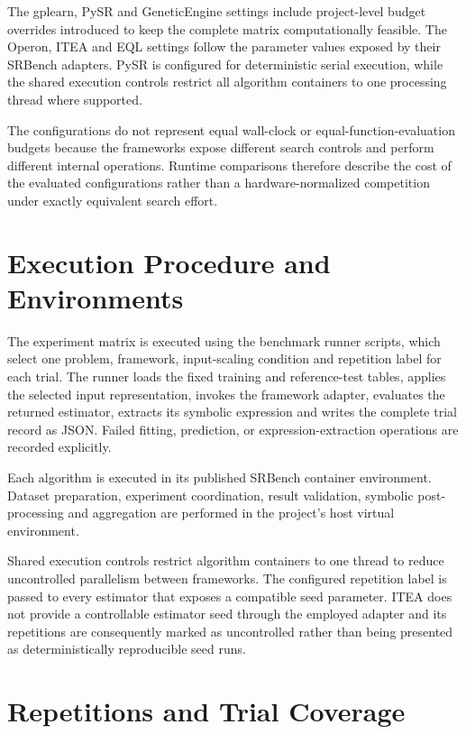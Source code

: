 \documentclass[12pt,oneside,bibtotoc,liststotoc]{scrbook}
\begin{document}
The gplearn, PySR and GeneticEngine settings include project-level budget overrides introduced to keep the complete matrix computationally feasible. The Operon, ITEA and EQL settings follow the parameter values exposed by their SRBench adapters. PySR is configured for deterministic serial execution, while the shared execution controls restrict all algorithm containers to one processing thread where supported.

The configurations do not represent equal wall-clock or equal-function-evaluation budgets because the frameworks expose different search controls and perform different internal operations. Runtime comparisons therefore describe the cost of the evaluated configurations rather than a hardware-normalized competition under exactly equivalent search effort.

\section{Execution Procedure and Environments}

The experiment matrix is executed using the benchmark runner scripts, which select one problem, framework, input-scaling condition and repetition label for each trial. The runner loads the fixed training and reference-test tables, applies the selected input representation, invokes the framework adapter, evaluates the returned estimator, extracts its symbolic expression and writes the complete trial record as JSON. Failed fitting, prediction, or expression-extraction operations are recorded explicitly.

Each algorithm is executed in its published SRBench container environment. Dataset preparation, experiment coordination, result validation, symbolic post-processing and aggregation are performed in the project's host virtual environment.

Shared execution controls restrict algorithm containers to one thread to reduce uncontrolled parallelism between frameworks. The configured repetition label is passed to every estimator that exposes a compatible seed parameter. ITEA does not provide a controllable estimator seed through the employed adapter and its repetitions are consequently marked as uncontrolled rather than being presented as deterministically reproducible seed runs.

\section{Repetitions and Trial Coverage}
\end{document}
